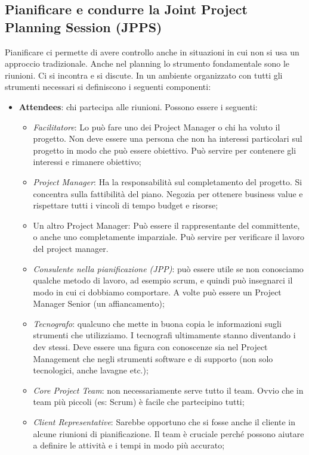 \subsection{Pianificare e condurre la Joint Project Planning Session (JPPS)}
Pianificare ci permette di avere controllo anche in situazioni in cui non si usa un approccio tradizionale. Anche nel planning lo strumento fondamentale sono le riunioni. Ci si incontra e si discute. In un ambiente organizzato con tutti gli strumenti necessari si definiscono i seguenti componenti:
\begin{itemize}
	\item \textbf{Attendees}: chi partecipa alle riunioni. Possono essere i seguenti:
	\begin{itemize}
		\item \textit{Facilitatore}: Lo può fare uno dei Project Manager o chi ha voluto il progetto. Non deve essere una persona che non ha interessi particolari sul progetto in modo che può essere obiettivo. Può servire per contenere gli interessi e rimanere obiettivo;
		\item \textit{Project Manager}: Ha la responsabilità sul completamento del progetto. Si concentra sulla fattibilità del piano. Negozia per ottenere business value e rispettare tutti i vincoli di tempo budget e risorse;
		\item Un altro Project Manager: Può essere il rappresentante del committente, o anche uno completamente imparziale. Può servire per verificare il lavoro del project manager.
		\item \textit{Consulente nella pianificazione (JPP)}: può essere utile se non conosciamo qualche metodo di lavoro, ad esempio scrum, e quindi può insegnarci il modo in cui ci dobbiamo comportare. A volte può essere un Project Manager Senior (un affiancamento);
		\item \textit{Tecnografo}: qualcuno che mette in buona copia le informazioni sugli strumenti che utilizziamo. I tecnografi ultimamente stanno diventando i dev stessi. Deve essere una figura con conoscenze sia nel Project Management che negli strumenti software e di supporto (non solo tecnologici, anche lavagne etc.);
		\item \textit{Core Project Team}: non necessariamente serve tutto il team. Ovvio che in team più piccoli (es: Scrum) è facile che partecipino tutti;
		\item \textit{Client Representative}: Sarebbe opportuno che si fosse anche il cliente in alcune riunioni di pianificazione. Il team è cruciale perché possono aiutare a definire le attività e i tempi in modo più accurato;

\end{itemize}
\end{itemize}
